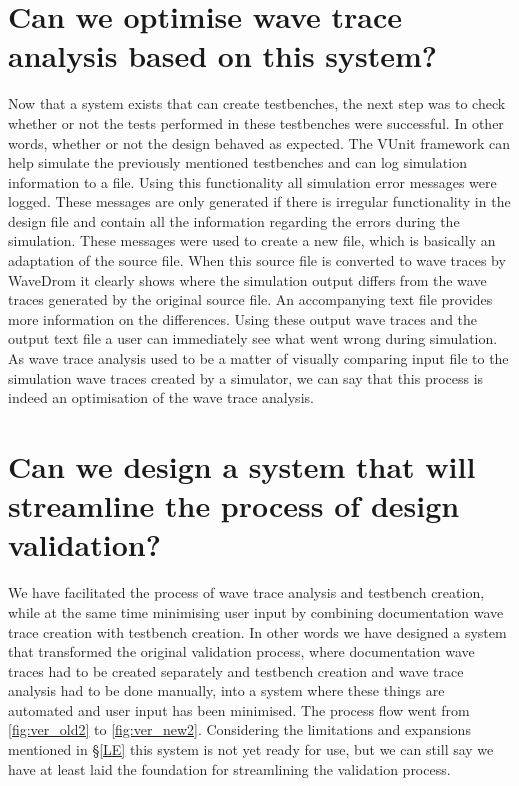 \section{Can we optimise wave trace analysis based on this system?}
Now that a system exists that can create testbenches, the next step was to check whether or not the tests performed in these testbenches were successful. In other words, whether or not the design behaved as expected.
\npar
The VUnit framework can help simulate the previously mentioned testbenches and can log simulation information to a file. Using this functionality all simulation error messages were logged. These messages are only generated if there is irregular functionality in the design file and contain all the information regarding the errors during the simulation. These messages were used to create a new file, which is basically an adaptation of the source file. When this source file is converted to wave traces by WaveDrom it clearly shows where the simulation output differs from the wave traces generated by the original source file. An accompanying text file provides more information on the differences. Using these output wave traces and the output text file a user can immediately see what went wrong during simulation.
\npar
As wave trace analysis used to be a matter of visually comparing input file to the simulation wave traces created by a simulator, we can say that this process is indeed an optimisation of the wave trace analysis.
\section{Can we design a system that will streamline the process of design validation?}
We have facilitated the process of wave trace analysis and testbench creation, while at the same time minimising user input by combining documentation wave trace creation with testbench creation. In other words we have designed a system that transformed the original validation process, where documentation wave traces had to be created separately and testbench creation and wave trace analysis had to be done manually, into a system where these things are automated and user input has been minimised. The process flow went from \ref{fig:ver_old2} to \ref{fig:ver_new2}.\newpage
{}
Considering the limitations and expansions mentioned in §\ref{LE} this system is not yet ready for use, but we can still say we have at least laid the foundation for streamlining the validation process.
